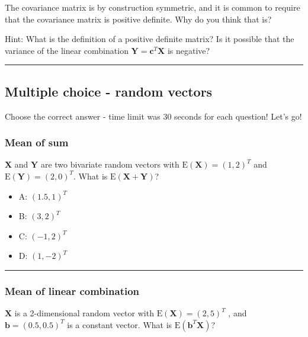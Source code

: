 \documentclass[]{article}
\providecommand{\tightlist}{%
  \setlength{\itemsep}{0pt}\setlength{\parskip}{0pt}}
\begin{document}
The covariance matrix is by construction symmetric, and it is common to
require that the covariance matrix is positive definite. Why do you
think that is?

Hint: What is the definition of a positive definite matrix? Is it
possible that the variance of the linear combination
\(\mathbf{Y}=\mathbf{c}^T\mathbf{X}\) is negative?

\begin{center}\rule{0.5\linewidth}{\linethickness}\end{center}

\hypertarget{multiple-choice---random-vectors}{%
\subsection{Multiple choice - random
vectors}\label{multiple-choice---random-vectors}}

Choose the correct answer - time limit was 30 seconds for each question!
Let's go!

\hypertarget{mean-of-sum}{%
\subsubsection{Mean of sum}\label{mean-of-sum}}

\(\mathbf{X}\) and \(\mathbf{Y}\) are two bivariate random vectors with
\(\text{E}(\mathbf{X})=(1,2)^T\) and \(\text{E}(\mathbf{Y})=(2,0)^T\).
What is \(\text{E}(\mathbf{X}+\mathbf{Y})\)?

\begin{itemize}
\tightlist
\item
  A: \((1.5,1)^T\)
\item
  B: \((3,2)^T\)
\item
  C: \((-1,2)^ T\)
\item
  D: \((1,-2)^T\)
\end{itemize}

\begin{center}\rule{0.5\linewidth}{\linethickness}\end{center}

\hypertarget{mean-of-linear-combination}{%
\subsubsection{Mean of linear
combination}\label{mean-of-linear-combination}}

\(\mathbf{X}\) is a 2-dimensional random vector with
\(\text{E}(\mathbf{X})=(2,5)^T\) , and \(\mathbf{b}=(0.5, 0.5)^T\) is a
constant vector. What is \(\text{E}(\mathbf{b}^T\mathbf{X})\)?
\end{document}
